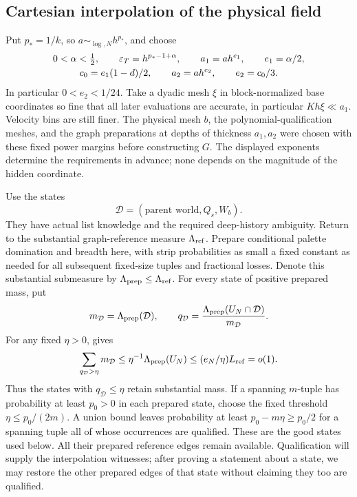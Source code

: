 \subsection{Cartesian interpolation of the physical field}

Put \(p_*=1/k\), so \(a\sim_{\log,N}h^{p_*}\), and choose
\begin{equation}\label{a05:improvement-scales}
 \begin{gathered}
 0<\alpha<\tfrac12,\qquad
 \varepsilon_T=h^{p_*-1+\alpha},\qquad
 a_1=ah^{e_1},\qquad e_1=\alpha/2,\\
 c_0=e_1(1-d)/2,\qquad
 a_2=ah^{e_2},\qquad e_2=c_0/3.
 \end{gathered}
\end{equation}
In particular \(0<e_2<1/24\).
Take a dyadic mesh \(\xi\) in block-normalized base coordinates so
fine that all later evaluations are accurate, in particular
\(Kh\xi\ll a_1\). Velocity bins are still finer.
The physical mesh \(b\), the polynomial-qualification meshes,
and the graph preparations at depths of thickness \(a_1,a_2\)
were chosen with these fixed power margins before constructing
\(G\). The displayed exponents determine the requirements in
advance; none depends on the magnitude of the hidden coordinate.

Use the states
\[
 \mathcal D=(\text{parent world},Q_s,W_b).
\]
They have actual list knowledge and the required deep-history
ambiguity. Return to the substantial graph-reference measure
\(\Lambda_{\rm ref}\). Prepare conditional palette domination
and breadth here, with
strip probabilities as small a fixed constant as needed for all
subsequent fixed-size tuples and fractional losses.
Denote this substantial submeasure by
\(\Lambda_{\rm prep}\leq\Lambda_{\rm ref}\). For every state of
positive prepared mass, put
\[
 m_{\mathcal D}=\Lambda_{\rm prep}(\mathcal D),\qquad
 q_{\mathcal D}
 =\frac{\Lambda_{\rm prep}(U_N\cap\mathcal D)}{m_{\mathcal D}}.
\]
For any fixed \(\eta>0\),  gives
\begin{equation}\label{a05:good-state-deletion}
 \sum_{q_{\mathcal D}>\eta}m_{\mathcal D}
 \leq\eta^{-1}\Lambda_{\rm prep}(U_N)
 \leq(e_N/\eta)L_{\rm ref}=o(1).
\end{equation}
Thus the states with \(q_{\mathcal D}\leq\eta\) retain substantial
mass. If a spanning \(m\)-tuple has probability at least
\(p_0>0\) in each prepared state, choose the fixed threshold
\(\eta\leq p_0/(2m)\). A union bound leaves probability at least
\(p_0-m\eta\geq p_0/2\) for a spanning tuple all of whose
occurrences are qualified. These are the good states used below.
All their prepared reference edges remain available. Qualification
will supply the interpolation witnesses; after proving a statement
about a state, we may restore the other prepared edges of that
state without claiming they too are qualified.

